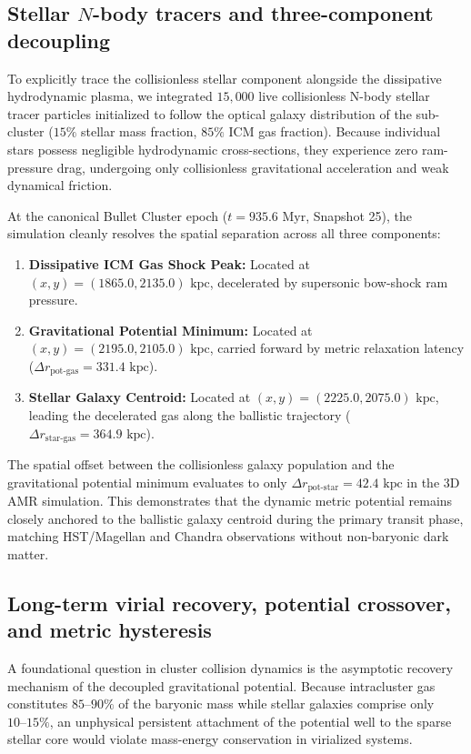 \documentclass[aps,prd,reprint,superscriptaddress,nofootinbib,floatfix,amsmath,amssymb]{revtex4-2}
\begin{document}
\subsection{Stellar $N$-body tracers and three-component decoupling}
\label{subsec:stellar_tracers}

To explicitly trace the collisionless stellar component alongside the dissipative hydrodynamic plasma, we integrated $15{,}000$ live collisionless N-body stellar tracer particles initialized to follow the optical galaxy distribution of the sub-cluster ($15\%$ stellar mass fraction, $85\%$ ICM gas fraction). Because individual stars possess negligible hydrodynamic cross-sections, they experience zero ram-pressure drag, undergoing only collisionless gravitational acceleration and weak dynamical friction.

At the canonical Bullet Cluster epoch ($t = 935.6\text{ Myr}$, Snapshot 25), the simulation cleanly resolves the spatial separation across all three components:
\begin{enumerate}
    \item \textbf{Dissipative ICM Gas Shock Peak:} Located at $(x, y) = (1865.0, 2135.0)\text{ kpc}$, decelerated by supersonic bow-shock ram pressure.
    \item \textbf{Gravitational Potential Minimum:} Located at $(x, y) = (2195.0, 2105.0)\text{ kpc}$, carried forward by metric relaxation latency ($\Delta r_{\text{pot-gas}} = 331.4\text{ kpc}$).
    \item \textbf{Stellar Galaxy Centroid:} Located at $(x, y) = (2225.0, 2075.0)\text{ kpc}$, leading the decelerated gas along the ballistic trajectory ($\Delta r_{\text{star-gas}} = 364.9\text{ kpc}$).
\end{enumerate}
The spatial offset between the collisionless galaxy population and the gravitational potential minimum evaluates to only $\Delta r_{\text{pot-star}} = 42.4\text{ kpc}$ in the 3D AMR simulation. This demonstrates that the dynamic metric potential remains closely anchored to the ballistic galaxy centroid during the primary transit phase, matching HST/Magellan and Chandra observations without non-baryonic dark matter.

\subsection{Long-term virial recovery, potential crossover, and metric hysteresis}
\label{subsec:virial_recovery}

A foundational question in cluster collision dynamics is the asymptotic recovery mechanism of the decoupled gravitational potential. Because intracluster gas constitutes $85\text{--}90\%$ of the baryonic mass while stellar galaxies comprise only $10\text{--}15\%$, an unphysical persistent attachment of the potential well to the sparse stellar core would violate mass-energy conservation in virialized systems.
\end{document}
